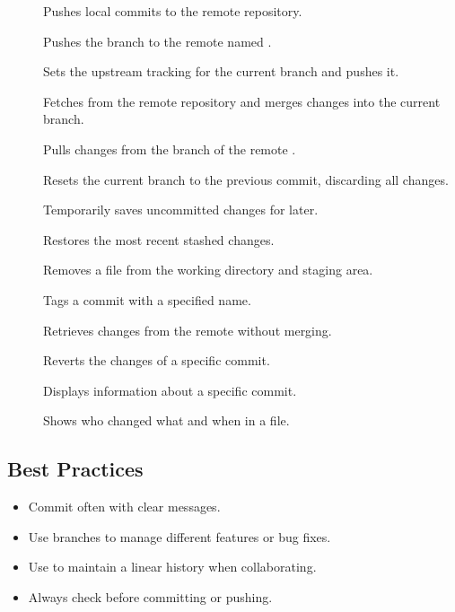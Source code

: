 \begin{description}
  \item[] Pushes local commits to the remote repository.
  \item[] Pushes the  branch to the remote named .
  \item[] Sets the upstream tracking for the current branch and pushes it.
  \item[] Fetches from the remote repository and merges changes into the current branch.
  \item[] Pulls changes from the  branch of the remote .
  \item[] Resets the current branch to the previous commit, discarding all changes.
  \item[] Temporarily saves uncommitted changes for later.
  \item[] Restores the most recent stashed changes.
  \item[] Removes a file from the working directory and staging area.
  \item[] Tags a commit with a specified name.
  \item[] Retrieves changes from the remote without merging.
  \item[] Reverts the changes of a specific commit.
  \item[] Displays information about a specific commit.
  \item[] Shows who changed what and when in a file.
\end{description}

\subsection*{Best Practices}
\begin{itemize}
  \item Commit often with clear messages.
  \item Use branches to manage different features or bug fixes.
  \item Use  to maintain a linear history when collaborating.
  \item Always check  before committing or pushing.
\end{itemize}
